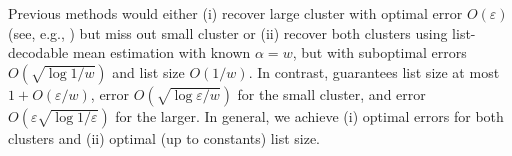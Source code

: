 Previous methods would either (i) recover large cluster with optimal error \(O(\varepsilon)\) (see, e.g., \cite{optimalErrorHuberModel}) but miss out small cluster  
or (ii) recover both clusters using list-decodable mean estimation with known $\alpha = w$, but with suboptimal errors \(O(\sqrt{\log 1 / w})\) and list size \(O(1 / w)\).
In contrast,  guarantees list size at most \(1 + O(\varepsilon / w)\), error \(O(\sqrt{\log \varepsilon / w})\) for the small cluster, and error \(O(\varepsilon \sqrt{\log 1 / \varepsilon})\) for the larger. 
In general, we achieve (i) optimal errors for both clusters and (ii) optimal (up to constants) list size.
